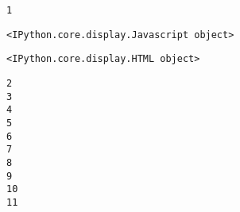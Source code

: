 \documentclass[11pt]{article}
\begin{document}
    \begin{Verbatim}[commandchars=\\\{\}]
1

    \end{Verbatim}

    
    \begin{verbatim}
<IPython.core.display.Javascript object>
    \end{verbatim}

    
    
    \begin{verbatim}
<IPython.core.display.HTML object>
    \end{verbatim}

    
    \begin{Verbatim}[commandchars=\\\{\}]
2
3
4
5
6
7
8
9
10
11

    \end{Verbatim}
\end{document}

